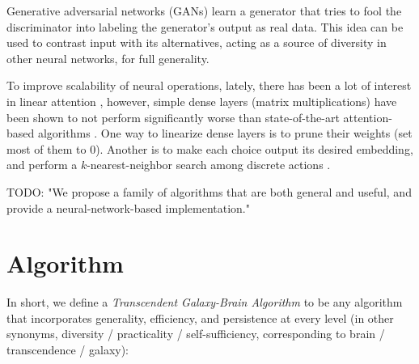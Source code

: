 \documentclass{article}
\begin{document}
Generative adversarial networks (GANs) \cite{goodfellow2014generative} learn a generator that tries to fool the discriminator into labeling the generator's output as real data. This idea can be used to contrast input with its alternatives, acting as a source of diversity in other neural networks, for full generality.

To improve scalability of neural operations, lately, there has been a lot of interest in linear attention \cite{schlag2021linear}, however, simple dense layers (matrix multiplications) have been shown to not perform significantly worse than state-of-the-art attention-based algorithms \cite{tolstikhin2021mlpmixer}. One way to linearize dense layers is to prune their weights \cite{zhou2021effective} (set most of them to $0$). Another is to make each choice output its desired embedding, and perform a $k$-nearest-neighbor search among discrete actions \cite{DBLP:journals/corr/Dulac-ArnoldESC15}.

    TODO: "We propose a family of algorithms that are both general and useful, and provide a neural-network-based implementation."

\section{Algorithm}

In short, we define a \textit{Transcendent Galaxy-Brain Algorithm} to be any algorithm that incorporates generality, efficiency, and persistence at every level (in other synonyms, diversity / practicality / self-sufficiency, corresponding to brain / transcendence / galaxy):
\end{document}
